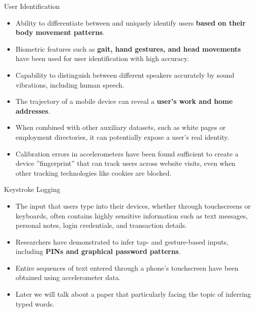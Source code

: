 \documentclass[ucs,9pt]{beamer}
\begin{document}
\begin{frame}{User Identification}
\begin{itemize}
	\item Ability to differentiate between and uniquely identify users
	\textbf{based on their body movement patterns}. 
	\item Biometric features such as \textbf{gait, hand gestures, and head movements}  have been used for user identification with high
	accuracy. %
	\item Capability to distinguish between different speakers accurately by sound vibrations, including human speech.
	\item The trajectory of a mobile device can reveal a \textbf{user’s work and home addresses}. 
	\item When combined with other auxiliary datasets, such as white pages
	or employment directories, it can potentially expose a user’s
	real identity.
	\item Calibration errors in accelerometers %
	have been found sufficient to create a device ”fingerprint” that can track users across website visits, even when other tracking technologies like cookies are
	blocked.
\end{itemize}
\end{frame}


\begin{frame}{Keystroke Logging}
  \begin{itemize}
  	\item The input that users type into their devices, whether through touchscreens or keyboards, often contains highly sensitive information such as text messages, personal notes, login credentials, and transaction details. 
  	\item Researchers have demonstrated to infer tap- and gesture-based inputs, including \textbf{PINs and graphical password patterns}. 
  	\item Entire sequences of text entered through a phone’s touchscreen have been obtained using accelerometer data. 
  	\pause
  	\item \alert{Later we will talk about a paper that particularly facing the topic of inferring typed words.}
  \end{itemize}
\end{frame}
\end{document}
